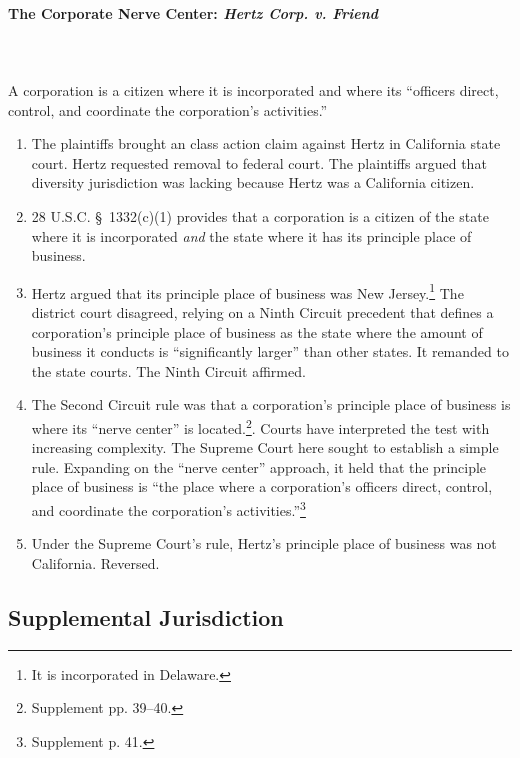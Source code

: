 \paragraph{The Corporate Nerve Center: \emph{Hertz Corp. v. Friend}}
~\\\\
A corporation is a citizen where it is incorporated and where its ``officers 
direct, control, and coordinate the corporation's activities.''

\begin{enumerate}
    \item The plaintiffs brought an class action claim against Hertz in 
    California state court. Hertz requested removal to federal court. The 
    plaintiffs argued that diversity jurisdiction was lacking because Hertz 
    was a California citizen.
    \item 28 U.S.C. \S\ 1332(c)(1) provides that a corporation is a citizen of 
    the state where it is incorporated \emph{and} the state where it has its 
    principle place of business.
    \item Hertz argued that its principle place of business was New 
    Jersey.\footnote{It is incorporated in Delaware.} The district court 
    disagreed, relying on a Ninth Circuit precedent that defines a 
    corporation's principle place of business as the state where the amount of 
    business it conducts is ``significantly larger'' than other states. It 
    remanded to the state courts. The Ninth Circuit affirmed.
    \item The Second Circuit rule was that a corporation's principle place of 
    business is where its ``nerve center'' is located.\footnote{Supplement pp.  
    39--40.}. Courts have interpreted the test with increasing complexity. The 
    Supreme Court here sought to establish a simple rule. Expanding on the 
    ``nerve center'' approach, it held that the principle place of business is 
    ``the place where a corporation's officers direct, control, and coordinate 
    the corporation's activities.''\footnote{Supplement p. 41.}
    \item Under the Supreme Court's rule, Hertz's principle place of business 
    was not California. Reversed.
\end{enumerate}

\subsection{Supplemental Jurisdiction}


